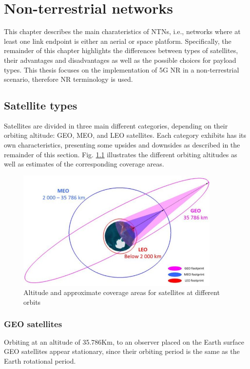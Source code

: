
\chapter{Non-terrestrial networks}
\label{chp:ntn}
This chapter describes the main charateristics of \ac{NTN}s, i.e., networks where at least one link endpoint is either an aerial or space platform. Specifically, the remainder of this chapter highlights the differences between types of satellites, their advantages and disadvantages as well as the possible choices for payload types. This thesis focuses on the implementation of 5G \ac{NR} in a non-terrestrial scenario, therefore \ac{NR} terminology is used.

\section{Satellite types}
\label{sec:satellite-types}
Satellites are divided in three main different categories, depending on their orbiting altitude: \ac{GEO}, \ac{MEO}, and \ac{LEO} satellites. Each category exhibits has its own characteristics, presenting some upsides and downsides as described in the remainder of this section. Fig. \ref{fig:satellite_coverages} illustrates the different orbiting altitudes as well as estimates of the corresponding coverage areas.

\begin{figure}[ht]
    \centering
    \includegraphics[width=0.9\textwidth]{res/satellite-coverages.jpg}
    \caption{Altitude and approximate coverage areas for satellites at different orbits \cite{sustainable-sat-com-6g}}
    \label{fig:satellite_coverages}
\end{figure}

\subsection{GEO satellites}
Orbiting at an altitude of 35.786Km, to an observer placed on the Earth surface \ac{GEO} satellites appear stationary, since their orbiting period is the same as the Earth rotational period.

